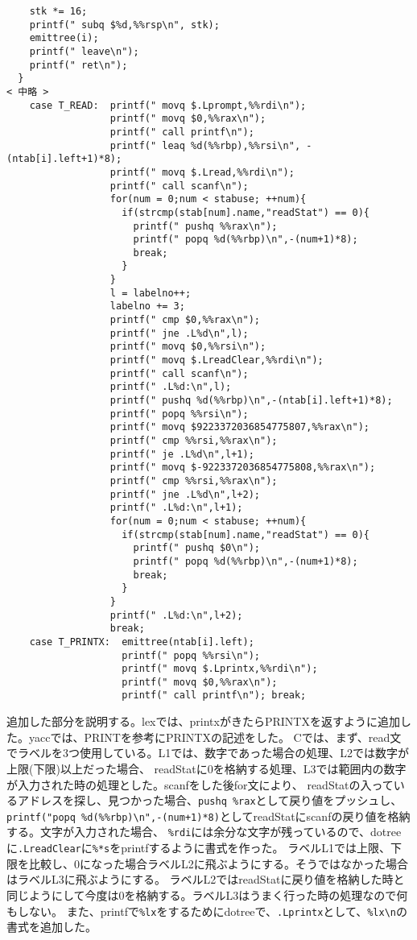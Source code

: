 \documentclass[a4paper,11pt]{jarticle}
\begin{document}
\begin{verbatim}
    stk *= 16;
    printf(" subq $%d,%%rsp\n", stk);
    emittree(i);
    printf(" leave\n");
    printf(" ret\n");
  }
< 中略 >
    case T_READ:  printf(" movq $.Lprompt,%%rdi\n");
                  printf(" movq $0,%%rax\n");
                  printf(" call printf\n");
                  printf(" leaq %d(%%rbp),%%rsi\n", -(ntab[i].left+1)*8);
                  printf(" movq $.Lread,%%rdi\n");
                  printf(" call scanf\n");
                  for(num = 0;num < stabuse; ++num){
                    if(strcmp(stab[num].name,"readStat") == 0){
                      printf(" pushq %%rax\n");
                      printf(" popq %d(%%rbp)\n",-(num+1)*8);
                      break;
                    }
                  }
                  l = labelno++;
                  labelno += 3;
                  printf(" cmp $0,%%rax\n");
                  printf(" jne .L%d\n",l);
                  printf(" movq $0,%%rsi\n");
                  printf(" movq $.LreadClear,%%rdi\n");
                  printf(" call scanf\n");
                  printf(" .L%d:\n",l);
                  printf(" pushq %d(%%rbp)\n",-(ntab[i].left+1)*8);
                  printf(" popq %%rsi\n");
                  printf(" movq $9223372036854775807,%%rax\n");
                  printf(" cmp %%rsi,%%rax\n");
                  printf(" je .L%d\n",l+1);
                  printf(" movq $-9223372036854775808,%%rax\n");
                  printf(" cmp %%rsi,%%rax\n");
                  printf(" jne .L%d\n",l+2);
                  printf(" .L%d:\n",l+1);
                  for(num = 0;num < stabuse; ++num){
                    if(strcmp(stab[num].name,"readStat") == 0){
                      printf(" pushq $0\n");
                      printf(" popq %d(%%rbp)\n",-(num+1)*8);
                      break;
                    }
                  }
                  printf(" .L%d:\n",l+2);
                  break;
    case T_PRINTX:  emittree(ntab[i].left);
                    printf(" popq %%rsi\n");
                    printf(" movq $.Lprintx,%%rdi\n");
                    printf(" movq $0,%%rax\n");
                    printf(" call printf\n"); break;
\end{verbatim}
追加した部分を説明する。lexでは、printxがきたらPRINTXを返すように追加した。yaccでは、PRINTを参考にPRINTXの記述をした。
Cでは、まず、read文でラベルを3つ使用している。L1では、数字であった場合の処理、L2では数字が上限(下限)以上だった場合、
readStatに0を格納する処理、L3では範囲内の数字が入力された時の処理とした。scanfをした後for文により、
readStatの入っているアドレスを探し、見つかった場合、\verb|pushq %rax|として戻り値をプッシュし、
\verb|printf("popq %d(%%rbp)\n",-(num+1)*8)|としてreadStatにscanfの戻り値を格納する。文字が入力された場合、
\verb|%rdi|には余分な文字が残っているので、dotreeに\verb|.LreadClear|に\verb|%*s|をprintfするように書式を作った。
ラベルL1では上限、下限を比較し、0になった場合ラベルL2に飛ぶようにする。そうではなかった場合はラベルL3に飛ぶようにする。
ラベルL2ではreadStatに戻り値を格納した時と同じようにして今度は0を格納する。ラベルL3はうまく行った時の処理なので何もしない。
また、printfで\verb|%lx|をするためにdotreeで、\verb|.Lprintx|として、\verb|%lx\n|の書式を追加した。\\
\end{document}
